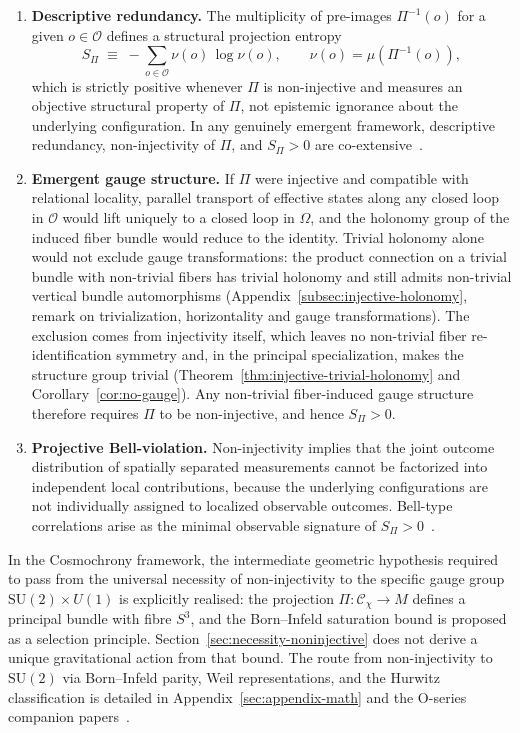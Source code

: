   \begin{enumerate}
    \item \textbf{Descriptive redundancy.}
    The multiplicity of pre-images $\Pi^{-1}(o)$ for a given $o \in \mathcal{O}$
    defines a structural projection entropy
    \begin{equation}
      S_\Pi \;\equiv\; -\sum_{o \in \mathcal{O}} \nu(o)\,\log\nu(o),
      \qquad \nu(o) = \mu\!\left(\Pi^{-1}(o)\right),
    \end{equation}
    which is strictly positive whenever $\Pi$ is non-injective and measures an
    objective structural property of $\Pi$, not epistemic ignorance about the
    underlying configuration.
    In any genuinely emergent framework, descriptive redundancy, non-injectivity
    of $\Pi$, and $S_\Pi > 0$ are co-extensive~\cite{Beau2026l}.

    \item \textbf{Emergent gauge structure.}
    If $\Pi$ were injective and compatible with relational locality, parallel
    transport of effective states along any closed loop in $\mathcal{O}$ would lift
    uniquely to a closed loop in $\Omega$, and the holonomy group of the induced
    fiber bundle would reduce to the identity.
    Trivial holonomy alone would not exclude gauge transformations: the product connection on a
    trivial bundle with non-trivial fibers has trivial holonomy and still admits non-trivial vertical bundle
    automorphisms (Appendix~\ref{subsec:injective-holonomy}, remark on trivialization,
    horizontality and gauge transformations).
    The exclusion comes from injectivity itself, which leaves no non-trivial fiber
    re-identification symmetry and, in the principal specialization, makes the structure group
    trivial (Theorem~\ref{thm:injective-trivial-holonomy} and Corollary~\ref{cor:no-gauge}).
    Any non-trivial fiber-induced gauge structure therefore requires $\Pi$ to be non-injective,
    and hence $S_\Pi > 0$.

    \item \textbf{Projective Bell-violation.}
    Non-injectivity implies that the joint outcome distribution of spatially separated
    measurements cannot be factorized into independent local contributions, because
    the underlying configurations are not individually assigned to localized observable
    outcomes.
    Bell-type correlations arise as the minimal observable signature of $S_\Pi >
    0$~\cite{Beau2026b}.
  \end{enumerate}

  In the Cosmochrony framework, the intermediate geometric hypothesis required to
  pass from the universal necessity of non-injectivity to the specific gauge group
  $\mathrm{SU}(2) \times U(1)$ is explicitly realised: the projection
  $\Pi : \mathcal{C}_\chi \to M$ defines a principal bundle with fibre $S^3$, and
  the Born--Infeld saturation bound is proposed as a selection principle.
  Section~\ref{sec:necessity-noninjective} does not derive a unique gravitational action from that bound.
  The route from non-injectivity to $\mathrm{SU}(2)$ via Born--Infeld parity, Weil
  representations, and the Hurwitz classification is detailed in Appendix~\ref{sec:appendix-math} and the
  O-series companion papers~\cite{Beau2026a18,Beau2026a19}.

